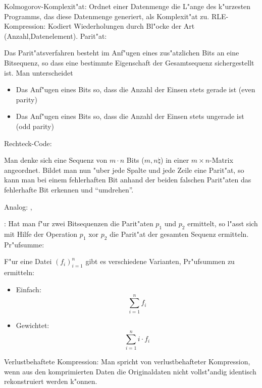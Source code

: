  Kolmogorov-Komplexit"at:{
  Ordnet einer Datenmenge die L"ange des k"urzesten Programms, das diese
  Datenmenge generiert, als Komplexit"at zu.
}
\algorithm RLE-Kompression:{
  Kodiert Wiederholungen durch Bl"ocke der Art (Anzahl,Datenelement).
}
 Parit"at:{
  Das Parit"atsverfahren besteht im Anf"ugen eines zus"atzlichen Bits
  an eine Bitsequenz, so dass eine bestimmte Eigenschaft der
  Gesamtsequenz sichergestellt ist. Man unterscheidet
  \begin{itemize}
    \item Das Anf"ugen eines Bits so, dass die Anzahl der Einsen 
      stets gerade ist (even parity)
    \item Das Anf"ugen eines Bits so, dass die Anzahl der Einsen 
      stets ungerade ist (odd parity)
  \end{itemize}
}
 Rechteck-Code:{
  Man denke sich eine Sequenz von $m\cdot n$ Bits ($m,n\natural$) in
  einer $m\times n$-Matrix angeordnet. Bildet man nun "uber jede Spalte
  und jede Zeile eine Parit"at, so kann man bei einem fehlerhaften Bit
  anhand der beiden falschen Parit"aten das fehlerhafte Bit erkennen
  und ``umdrehen''.
  
  Analog: , 
}
\remark:{
  Hat man f"ur zwei Bitsequenzen die Parit"aten $p_1$ und $p_2$ ermittelt,
  so l"asst sich mit Hilfe der Operation $p_1\text{ xor } p_2$ die
  Parit"at der gesamten Sequenz ermitteln.
}
 Pr"ufsumme:{
  F"ur eine Datei $(f_i)_{i=1}^n$ gibt es verschiedene Varianten, Pr"ufsummen zu 
  ermitteln:
  \begin{itemize}
    \item Einfach: \[\sum_{i=1}^n f_i\]
    \item Gewichtet: \[\sum_{i=1}^n i\cdot f_i\]
  \end{itemize}
}
 Verlustbehaftete Kompression:{
  Man spricht von verlustbehafteter Kompression, wenn aus den komprimierten
  Daten die Originaldaten nicht vollst"andig identisch rekonstruiert werden
  k"onnen.
}
